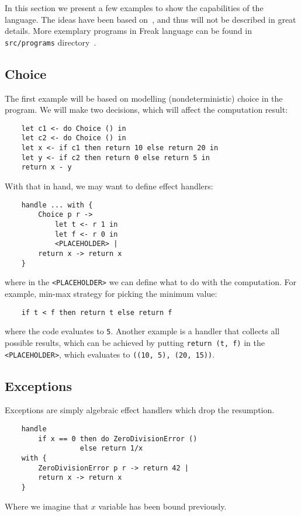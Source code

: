 \documentclass[declaration,shortabstract]{iithesis}
\theoremstyle{definition} \newtheorem{definition}{Definition}[chapter]
\theoremstyle{remark} \newtheorem{remark}[definition]{Observation}
\theoremstyle{plain} \newtheorem{theorem}[definition]{Theorem}
\theoremstyle{plain} \newtheorem{lemma}[definition]{Lemma}
\begin{document}
    In this section we present a few examples to show the capabilities of the language.
    The ideas have been based on~\cite{programming-in-eff}, and thus will not be
    described in great details. More exemplary programs in Freak language can
    be found in \verb!src/programs! directory~\cite{freak}.

    \subsection{Choice}\label{sec:choice-example}

    The first example will be based on modelling (nondeterministic) choice
    in the program. We will make two decisions, which will affect the computation
    result:

\begin{verbatim}
    let c1 <- do Choice () in
    let c2 <- do Choice () in
    let x <- if c1 then return 10 else return 20 in
    let y <- if c2 then return 0 else return 5 in
    return x - y
\end{verbatim}
    With that in hand, we may want to define effect handlers:

\begin{verbatim}
    handle ... with {
        Choice p r ->
            let t <- r 1 in
            let f <- r 0 in
            <PLACEHOLDER> |
        return x -> return x
    }
\end{verbatim}
    where in the \verb!<PLACEHOLDER>! we can define what to do with the
    computation. For example, min-max strategy for picking the minimum value:

\begin{verbatim}
    if t < f then return t else return f
\end{verbatim}
    where the code evaluates to \verb!5!. Another example is a handler that
    collects all possible results, which can be achieved by putting
    \verb!return (t, f)! in the \verb!<PLACEHOLDER>!, which evaluates to
    \verb!((10, 5), (20, 15))!.

    \subsection{Exceptions}

    Exceptions are simply algebraic effect handlers which drop the resumption.

\begin{verbatim}
    handle
        if x == 0 then do ZeroDivisionError ()
                  else return 1/x
    with {
        ZeroDivisionError p r -> return 42 |
        return x -> return x
    }
\end{verbatim}
    Where we imagine that $x$ variable has been bound previously.
\end{document}
